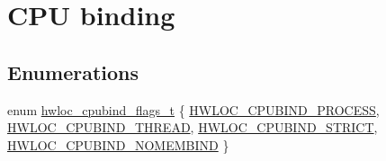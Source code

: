 \hypertarget{a00190}{}\section{C\+PU binding}
\label{a00190}
\subsection*{Enumerations}
\begin{DoxyCompactItemize}
\item 
enum \hyperlink{a00190_ga217dc8d373f8958cc93c154ebce1c71c}{hwloc\+\_\+cpubind\+\_\+flags\+\_\+t} \{ \hyperlink{a00190_gga217dc8d373f8958cc93c154ebce1c71ca2e0dd0128dac6b03408c7dd170477fdc}{H\+W\+L\+O\+C\+\_\+\+C\+P\+U\+B\+I\+N\+D\+\_\+\+P\+R\+O\+C\+E\+SS}, 
\hyperlink{a00190_gga217dc8d373f8958cc93c154ebce1c71caf1b6bbad00d7b1017b918e3719f4d421}{H\+W\+L\+O\+C\+\_\+\+C\+P\+U\+B\+I\+N\+D\+\_\+\+T\+H\+R\+E\+AD}, 
\hyperlink{a00190_gga217dc8d373f8958cc93c154ebce1c71ca679a7e0f0c7ee06b123565f90d98e7fa}{H\+W\+L\+O\+C\+\_\+\+C\+P\+U\+B\+I\+N\+D\+\_\+\+S\+T\+R\+I\+CT}, 
\hyperlink{a00190_gga217dc8d373f8958cc93c154ebce1c71ca41ce440443cc3087caed95ab60edcad6}{H\+W\+L\+O\+C\+\_\+\+C\+P\+U\+B\+I\+N\+D\+\_\+\+N\+O\+M\+E\+M\+B\+I\+ND}
 \}
\end{DoxyCompactItemize}
